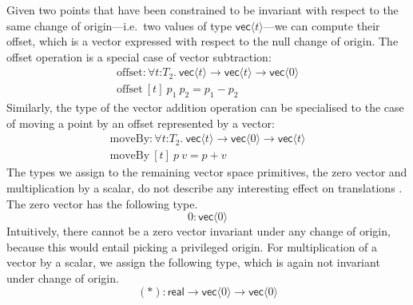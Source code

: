 Given two points that have been constrained to be invariant with
respect to the same change of origin---i.e.~two values of type
$\mathsf{vec}\langle t \rangle$---we can compute their offset, which
is a vector expressed with respect to the null change of origin. The
offset operation is a special case of vector subtraction:
\begin{displaymath}
  \begin{array}{l}
    \mathrm{offset} : \forall t \mathord:T_2.\ \mathsf{vec}\langle t \rangle \to \mathsf{vec}\langle t \rangle \to \mathsf{vec}\langle 0 \rangle \\
    \mathrm{offset}\ [t]\ p_1\ p_2 = p_1 - p_2
  \end{array}
\end{displaymath}
Similarly, the type of the vector addition operation can be
specialised to the case of moving a point by an offset represented by
a vector:
\begin{displaymath}
  \begin{array}{l}
    \mathrm{moveBy} : \forall t \mathord:T_2.\ \mathsf{vec}\langle t \rangle \to \mathsf{vec}\langle 0 \rangle \to \mathsf{vec}\langle t \rangle \\
    \mathrm{moveBy}\ [t]\ p\ v = p + v
  \end{array}
\end{displaymath}
The types we assign to the remaining vector space primitives, the zero
vector and multiplication by a scalar, do not describe any interesting
effect on translations%
. The zero vector has the following type.
\begin{displaymath}
  \mathrm{0} : \mathsf{vec}\langle 0 \rangle
\end{displaymath}
Intuitively, there cannot be a zero vector invariant under any change
of origin, because this would entail picking a privileged origin. For
multiplication of a vector by a scalar, we assign the following type,
which is again not invariant under change of origin.
\begin{displaymath}
  (*) : \mathsf{real} \to \mathsf{vec}\langle 0 \rangle \to \mathsf{vec}\langle 0 \rangle
\end{displaymath}

